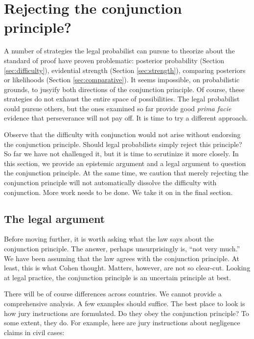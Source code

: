 \documentclass[
  10pt,
  dvipsnames,enabledeprecatedfontcommands]{scrartcl}
\begin{document}
\hypertarget{rejecting-the-conjunction-principle}{%
\section{Rejecting the conjunction
principle?}\label{rejecting-the-conjunction-principle}}

\label{sec:reject}

A number of strategies the legal probabilist can pursue to theorize
about the standard of proof have proven problematic: posterior
probability (Section \ref{sec:difficulty}), evidential strength (Section
\ref{sec:strength}), comparing posteriors or likelihoods (Section
\ref{sec:comparative}). It seems impossible, on probabilistic grounds,
to jusyify both directions of the conjunction principle. Of course,
these strategies do not exhaust the entire space of possibilities. The
legal probabilist could pursue others, but the ones examined so far
provide good \textit{prima facie} evidence that perseverance will not
pay off. It is time to try a different approach.

Observe that the difficulty with conjunction would not arise without
endorsing the conjunction principle. Should legal probabilists simply
reject this principle? So far we have not challenged it, but it is time
to scrutinize it more closely. In this section, we provide an epistemic
argument and a legal argument to question the conjunction principle. At
the same time, we caution that merely rejecting the conjunction
principle will not automatically dissolve the difficulty with
conjunction. More work needs to be done. We take it on in the final
section.

\hypertarget{the-legal-argument}{%
\subsection{The legal argument}\label{the-legal-argument}}

Before moving further, it is worth asking what the law says about the
conjunction principle. The answer, perhaps unsurprisingly is, ``not very
much.'' We have been assuming that the law agrees with the conjunction
principle. At least, this is what Cohen thought. Matters, however, are
not so clear-cut. Looking at legal practice, the conjunction principle
is an uncertain principle at best.

There will be of course differences across countries. We cannot provide
a comprehensive analysis. A few examples should suffice. The best place
to look is how jury instructions are formulated. Do they obey the
conjunction principle? To some extent, they do. For example, here are
jury instructions about negligence claims in civil cases:
\end{document}
